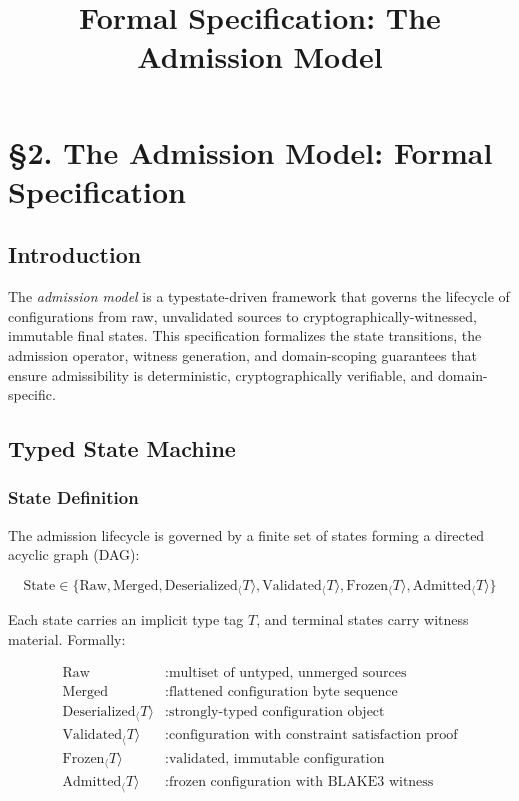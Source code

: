 \documentclass[11pt]{article}
\title{Formal Specification: The Admission Model}
\author{}
\date{}
\begin{document}
\section*{\S 2. The Admission Model: Formal Specification}

\subsection{Introduction}

The \textit{admission model} is a typestate-driven framework that governs the lifecycle of configurations from raw, unvalidated sources to cryptographically-witnessed, immutable final states. This specification formalizes the state transitions, the admission operator, witness generation, and domain-scoping guarantees that ensure admissibility is deterministic, cryptographically verifiable, and domain-specific.

\subsection{Typed State Machine}

\subsubsection{State Definition}

The admission lifecycle is governed by a finite set of states forming a directed acyclic graph (DAG):

\begin{equation}
\text{State} \in \{\text{Raw}, \text{Merged}, \text{Deserialized}_\langle T \rangle, \text{Validated}_\langle T \rangle, \text{Frozen}_\langle T \rangle, \text{Admitted}_\langle T \rangle\}
\end{equation}

Each state carries an implicit type tag $T$, and terminal states carry witness material. Formally:

\begin{align}
\text{Raw} &: \text{multiset of untyped, unmerged sources} \\
\text{Merged} &: \text{flattened configuration byte sequence} \\
\text{Deserialized}_\langle T \rangle &: \text{strongly-typed configuration object} \\
\text{Validated}_\langle T \rangle &: \text{configuration with constraint satisfaction proof} \\
\text{Frozen}_\langle T \rangle &: \text{validated, immutable configuration} \\
\text{Admitted}_\langle T \rangle &: \text{frozen configuration with BLAKE3 witness}
\end{align}
\end{document}
